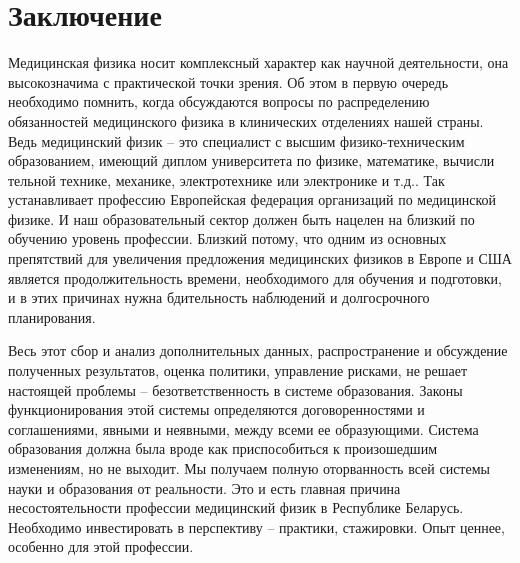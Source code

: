 
\section{Заключение}

Медицинская физика носит комплексный характер как научной деятельности, она высокозначима с практической точки зрения. Об этом в первую очередь необходимо помнить, когда обсуждаются вопросы по распределению обязанностей медицинского физика в клинических отделениях нашей страны. Ведь медицинский физик -- это специалист с высшим физико-техническим образованием, имеющий диплом университета по физике, математике, вычисли􏰀 тельной технике, механике, электротехнике или электронике и т.д.. Так устанавливает профессию Европейская федерация организаций по медицинской физике. И наш образовательный сектор должен быть нацелен на близкий по обучению уровень профессии. Близкий потому, что одним из основных препятствий для увеличения предложения медицинских физиков в Европе и США является продолжительность времени, необходимого для обучения и подготовки, и в этих причинах нужна бдительность наблюдений и долгосрочного планирования. 

Весь этот сбор и анализ дополнительных данных, распространение и обсуждение полученных результатов, оценка политики, управление рисками, не решает настоящей проблемы -- безответственность в системе образования. Законы функционирования этой системы определяются договоренностями и соглашениями, явными и неявными, между всеми ее образующими. Система образования должна была вроде как приспособиться к произошедшим изменениям, но не выходит. Мы получаем полную оторванность всей системы науки и образования от реальности. Это и есть главная причина несостоятельности профессии медицинский физик в Республике Беларусь. Необходимо инвестировать в перспективу -- практики, стажировки. Опыт ценнее, особенно для этой профессии. 



